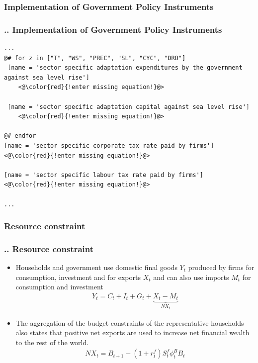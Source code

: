 \documentclass[11pt,aspectratio=169]{beamer}
\begin{document}
\subsubsection{Implementation of Government Policy Instruments}
\begin{frame}[fragile]
\frametitle{{\thesection.\thesubsection.\thesubsubsection} Implementation of Government Policy Instruments}

\begin{lstlisting}[frame = single]
...
@# for z in ["T", "WS", "PREC", "SL", "CYC", "DRO"]
 [name = 'sector specific adaptation expenditures by the government against sea level rise']
	<@\color{red}{!enter missing equation!}@>

 [name = 'sector specific adaptation capital against sea level rise']
	<@\color{red}{!enter missing equation!}@>
	
@# endfor
[name = 'sector specific corporate tax rate paid by firms']
<@\color{red}{!enter missing equation!}@>

[name = 'sector specific labour tax rate paid by firms']
<@\color{red}{!enter missing equation!}@>

...
\end{lstlisting}
\end{frame}

\subsubsection{Resource constraint}
\begin{frame}
\frametitle{{\thesection.\thesubsection.\thesubsubsection} Resource constraint}
\scriptsize
\begin{itemize}
\item Households and government use domestic final goods $Y_t$ produced by firms for consumption, investment and for exports $X_{t}$ and can also use imports $M_t$ for consumption and investment
\begin{align}
Y_{t} = C_{t} + I_{t} + G_{t} + \underbrace{X_{t} - M_{t}}_{NX_{t}}
\end{align}
\item The aggregation of the budget constraints of the representative households also states that positive net exports are used to increase net financial wealth to the rest of the world.
\begin{align}
NX_t = B_{t+1} - (1 + r^{f}_{t}) S^{f}_{t} \phi^B_{t} B_{t}
\end{align}
\end{itemize}
\end{frame}
\end{document}
